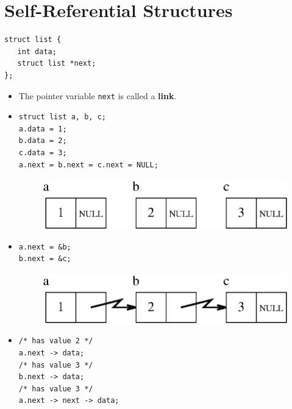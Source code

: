 \documentclass[a4,portraitt]{slides}
\begin{document}
\newpage
\section*{Self-Referential Structures}
\begin{verbatim}
struct list {
   int data;
   struct list *next;
};
\end{verbatim}
\begin{itemize}
\item The pointer variable \verb^next^ is called a {\bf link}.
\item \begin{verbatim}
struct list a, b, c;
a.data = 1;
b.data = 2;
c.data = 3;
a.next = b.next = c.next = NULL;
\end{verbatim}
\begin{center}
\begin{figure}[h]
\centerline{
\includegraphics{../Figs/link1.eps}
}
\end{figure}
\end{center}
\end{itemize}
\newpage
\begin{itemize}
\item \begin{verbatim}
a.next = &b;
b.next = &c;
\end{verbatim}
\begin{center}
\begin{figure}[h]
\centerline{
\includegraphics{../Figs/link2.eps}
}
\end{figure}
\end{center}
\item \begin{verbatim}
/* has value 2 */
a.next -> data;
/* has value 3 */
b.next -> data;
/* has value 3 */
a.next -> next -> data;
\end{verbatim}
\end{itemize}
\end{document}
